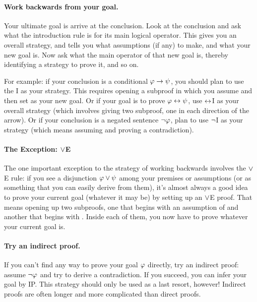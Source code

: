 \paragraph{Work backwards from your goal.}
Your ultimate goal is arrive at the conclusion. Look at the conclusion and ask what the introduction rule is for its main logical operator. This gives you an overall strategy, and tells you what assumptions  (if any)  to make, and what your new goal is. Now ask what the main operator of that new goal is, thereby identifying a strategy to prove it, and so on.


For example: if your conclusion is a conditional $\mathcal{\varphi}\rightarrow\mathcal{\psi}$, you should plan to use the {\eif}I as your strategy. This requires opening a subproof in which you assume \meta{\varphi} and then set \meta{\psi} as your new goal.  Or if your goal is to prove $\mathcal{\varphi} \leftrightarrow \mathcal{\psi}$, use $\leftrightarrow$I as your overall strategy (which involves giving two subproof, one in each direction of the arrow). Or if your conclusion is a negated sentence $\neg \mathcal{\varphi}$, plan to use $\neg$I as your strategy (which means assuming \meta{\varphi} and proving a contradiction).


\paragraph{The Exception: $\vee$E}
The one important exception to the strategy of working backwards involves the $\vee$E rule: if you see a disjunction $\mathcal{\varphi} \vee \mathcal{\psi}$ among your premises or assumptions (or as something that you can easily derive from them), it's almost always a good idea to prove your current goal (whatever it may be) by setting up an $\vee$E proof.  That means opening up two subproofs, one that begins with an assumption of \meta{\varphi} and another that begins with \meta{\psi}.  Inside each of them, you now have to prove whatever your current goal is.



\paragraph{Try an indirect proof.}
If you can't find any way to prove your goal $\mathcal{\varphi}$ directly, try an indirect proof: assume $\neg \mathcal{\varphi}$ and try to derive a contradiction.  If you succeed, you can infer your goal \meta{\varphi} by IP.  This strategy should only be used as a last resort, however!  Indirect proofs are often longer and more complicated than direct proofs.

